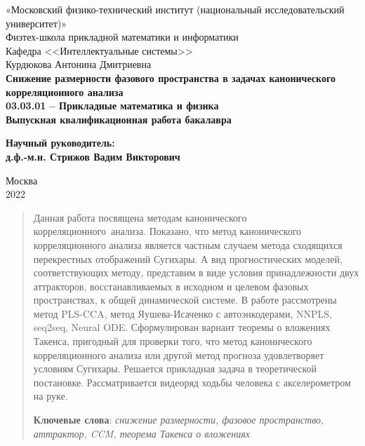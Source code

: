 \documentclass[12pt]{extarticle}
\begin{document}
\thispagestyle{empty}
\begin{center}
    \sc
        «Московский физико-технический институт \rm{(национальный исследовательский университет)}»\\
        Физтех-школа прикладной математики и информатики\\
        Кафедра <<Интеллектуальные системы>>
        \\[35mm]
    \rm\large
        Курдюкова Антонина Дмитриевна\\[10mm]
    \bf\Large
		Снижение размерности фазового пространства в задачах канонического корреляционного анализа\\[10mm]
    \rm\normalsize
        03.03.01 -- Прикладные математика и физика\\[10mm]
    \sc
        Выпускная квалификационная работа бакалавра\\[10mm]
\end{center}
\hfill\parbox{85mm}{
    \begin{flushleft}
    \bf
        Научный руководитель:\\
    \rm
        д.ф.-м.н. Стрижов Вадим Викторович\\[3.9cm]
    \end{flushleft}
}
\begin{center}
    Москва\\
    2022
\end{center}

\newpage
\tableofcontents
\newpage

\begin{abstract}
Данная работа посвящена методам канонического корреляционного~анализа. Показано, что метод канонического корреляционного анализа является частным случаем метода сходящихся перекрестных отображений Сугихары. А вид прогностических моделей, соответствующих методу, представим в виде условия принадлежности двух аттракторов,  восстанавливаемых в исходном и целевом фазовых пространствах, к общей динамической системе. В работе рассмотрены метод PLS-CCA, метод Яушева-Исаченко с автоэнкодерами, NNPLS, seq2seq, Neural ODE. Сформулирован вариант теоремы о вложениях Такенса, пригодный для проверки того, что метод канонического корреляционного анализа или другой метод прогноза удовлетворяет условиям Сугихары. Решается прикладная задача в теоретической постановке. Рассматривается видеоряд ходьбы человека с акселерометром на руке.
\\
\bigskip
\noindent

\textbf{Ключевые слова}: \emph {снижение размерности, фазовое пространство, аттрактор, CCM, теорема Такенса о вложениях}
\end{abstract}
\newpage
\end{document}
